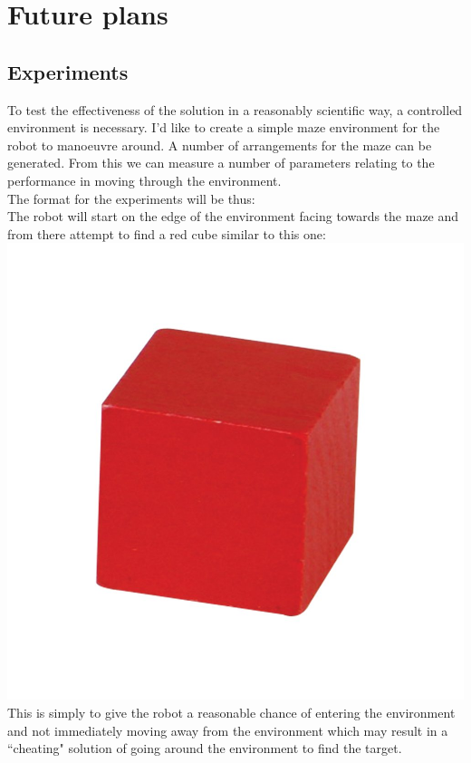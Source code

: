 \documentclass[10pt,a4paper]{report}
\begin{document}
\section*{Future plans}
	\subsection*{Experiments}
		To test the effectiveness of the solution in a reasonably scientific way, a controlled environment is necessary. I'd like to create a simple maze environment for the robot to manoeuvre around. A number of arrangements for the maze can be generated. From this we can measure a number of parameters relating to the performance in moving through the environment. \\
		The format for the experiments will be thus: \\
		The robot will start on the edge of the environment facing towards the maze and from there attempt to find a red cube similar to this one: \\
		\includegraphics[scale=0.2]{RedCube}  \\
		This is simply to give the robot a reasonable chance of entering the environment and not immediately moving away from the environment which may result in a ``cheating" solution of going around the environment to find the target. \\
\end{document}
